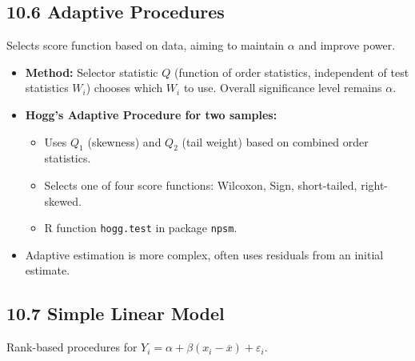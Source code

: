 \subsection{10.6 Adaptive Procedures}

Selects score function based on data, aiming to maintain $\alpha$ and improve power.

\begin{itemize}
	\item \textbf{Method:} Selector statistic $Q$ (function of order statistics, independent of test statistics $W_i$) chooses which $W_i$ to use. Overall significance level remains $\alpha$.
	\item \textbf{Hogg's Adaptive Procedure for two samples:}
	\begin{itemize}
		\item Uses $Q_1$ (skewness) and $Q_2$ (tail weight) based on combined order statistics.
		\item Selects one of four score functions: Wilcoxon, Sign, short-tailed, right-skewed.
		\item R function \lstinline{hogg.test} in package \lstinline{npsm}.
	\end{itemize}
	\item Adaptive estimation is more complex, often uses residuals from an initial estimate.
\end{itemize}

\subsection{10.7 Simple Linear Model}

Rank-based procedures for $Y_i = \alpha + \beta(x_i-\overline{x}) + \varepsilon_i$.

